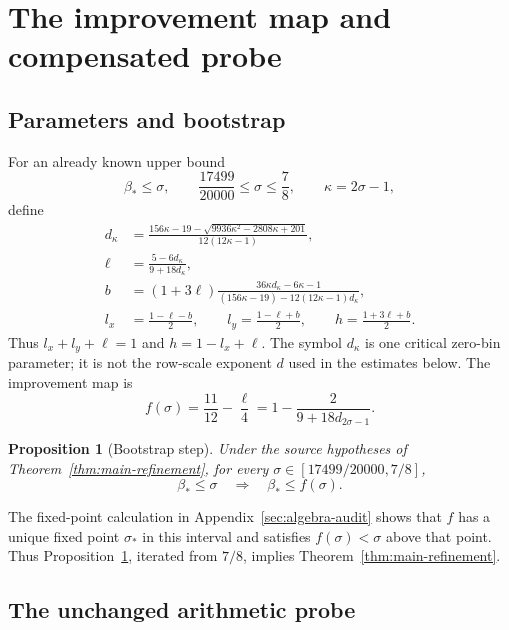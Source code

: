 \documentclass[11pt,a4paper]{article}
\numberwithin{equation}{section}
\newtheorem{proposition}[theorem]{Proposition}
\theoremstyle{remark}
\begin{document}
\section{The improvement map and compensated probe}
\label{sec:map}
\subsection{Parameters and bootstrap}

For an already known upper bound
\[
 \beta_*\le\sigma,\qquad
 \frac{17499}{20000}\le\sigma\le\frac78,
 \qquad \kappa=2\sigma-1,
\]
define
\begin{align}
 d_\kappa&=
 \frac{156\kappa-19-
 \sqrt{9936\kappa^2-2808\kappa+201}}
 {12(12\kappa-1)},\label{eq:main-critical-bin}\\
 \ell&=\frac{5-6d_\kappa}{9+18d_\kappa},\label{eq:main-ell}\\
 b&=(1+3\ell)
 \frac{36\kappa d_\kappa-6\kappa-1}
 {(156\kappa-19)-12(12\kappa-1)d_\kappa},\label{eq:main-b}\\
 l_x&=\frac{1-\ell-b}{2},\qquad
 l_y=\frac{1-\ell+b}{2},\qquad
 h=\frac{1+3\ell+b}{2}.\label{eq:main-geometry}
\end{align}
Thus $l_x+l_y+\ell=1$ and $h=1-l_x+\ell$.
The symbol $d_\kappa$ is one critical zero-bin parameter; it is not
the row-scale exponent $d$ used in the estimates below.
The improvement map is
\begin{equation}\label{eq:main-map}
 f(\sigma)=\frac{11}{12}-\frac\ell4
          =1-\frac{2}{9+18d_{2\sigma-1}}.
\end{equation}
\begin{proposition}[Bootstrap step]\label{prop:bootstrap}
Under the source hypotheses of Theorem~\ref{thm:main-refinement},
for every $\sigma\in[17499/20000,7/8]$,
\begin{equation}\label{eq:main-bootstrap}
 \beta_*\le\sigma\quad\Longrightarrow\quad
 \beta_*\le f(\sigma).
\end{equation}
\end{proposition}
The fixed-point calculation in Appendix~\ref{sec:algebra-audit}
shows that $f$ has a unique fixed point $\sigma_*$ in this interval
and satisfies $f(\sigma)<\sigma$ above that point. Thus
Proposition~\ref{prop:bootstrap}, iterated from $7/8$, implies
Theorem~\ref{thm:main-refinement}.

\subsection{The unchanged arithmetic probe}
\end{document}
